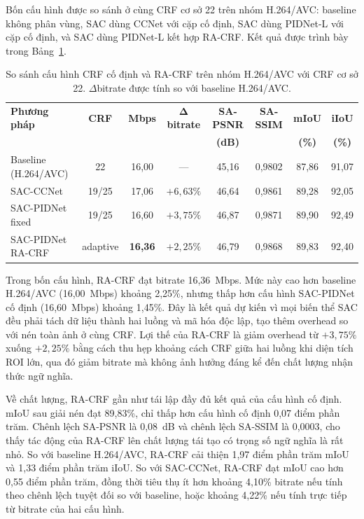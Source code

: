 Bốn cấu hình được so sánh ở cùng CRF cơ sở 22 trên nhóm H.264/AVC: baseline không phân vùng, SAC dùng CCNet với cặp cố định, SAC dùng PIDNet-L với cặp cố định, và SAC dùng PIDNet-L kết hợp RA-CRF. Kết quả được trình bày trong Bảng~\ref{tab:racrf-result}.

\begin{table}[H]
\centering
\caption{So sánh cấu hình CRF cố định và RA-CRF trên nhóm H.264/AVC với CRF cơ sở 22. $\Delta$bitrate được tính so với baseline H.264/AVC.}
\label{tab:racrf-result}
\small
\setlength{\tabcolsep}{3.5pt}
\renewcommand{\arraystretch}{1.12}
\begin{tabular}{lccccccc}
\toprule
\textbf{Phương pháp} & \textbf{CRF} & \textbf{Mbps} & $\boldsymbol{\Delta}$\textbf{bitrate} & \textbf{SA-PSNR} & \textbf{SA-SSIM} & \textbf{mIoU} & \textbf{iIoU} \\
 & & & & \textbf{(dB)} & & \textbf{(\%)} & \textbf{(\%)} \\
\midrule
Baseline (H.264/AVC) & 22 & 16,00 & --- & 45,16 & 0,9802 & 87,86 & 91,07 \\
SAC-CCNet & 19/25 & 17,06 & $+6,63\%$ & 46,64 & 0,9861 & 89,28 & 92,05 \\
SAC-PIDNet fixed & 19/25 & 16,60 & $+3,75\%$ & 46,87 & 0,9871 & 89,90 & 92,49 \\
SAC-PIDNet RA-CRF & adaptive & \textbf{16,36} & $+2,25\%$ & 46,79 & 0,9868 & 89,83 & 92,40 \\
\bottomrule
\end{tabular}
\end{table}

Trong bốn cấu hình, RA-CRF đạt bitrate 16,36~Mbps. Mức này cao hơn baseline H.264/AVC (16,00~Mbps) khoảng 2,25\%, nhưng thấp hơn cấu hình SAC-PIDNet cố định (16,60~Mbps) khoảng 1,45\%. Đây là kết quả dự kiến vì mọi biến thể SAC đều phải tách dữ liệu thành hai luồng và mã hóa độc lập, tạo thêm overhead so với nén toàn ảnh ở cùng CRF. Lợi thế của RA-CRF là giảm overhead từ $+3{,}75\%$ xuống $+2{,}25\%$ bằng cách thu hẹp khoảng cách CRF giữa hai luồng khi diện tích ROI lớn, qua đó giảm bitrate mà không ảnh hưởng đáng kể đến chất lượng nhận thức ngữ nghĩa.

Về chất lượng, RA-CRF gần như tái lập đầy đủ kết quả của cấu hình cố định. mIoU sau giải nén đạt 89,83\%, chỉ thấp hơn cấu hình cố định 0,07 điểm phần trăm. Chênh lệch SA-PSNR là 0,08~dB và chênh lệch SA-SSIM là 0,0003, cho thấy tác động của RA-CRF lên chất lượng tái tạo có trọng số ngữ nghĩa là rất nhỏ. So với baseline H.264/AVC, RA-CRF cải thiện 1,97 điểm phần trăm mIoU và 1,33 điểm phần trăm iIoU. So với SAC-CCNet, RA-CRF đạt mIoU cao hơn 0,55 điểm phần trăm, đồng thời tiêu thụ ít hơn khoảng 4,10\% bitrate nếu tính theo chênh lệch tuyệt đối so với baseline, hoặc khoảng 4,22\% nếu tính trực tiếp từ bitrate của hai cấu hình.

